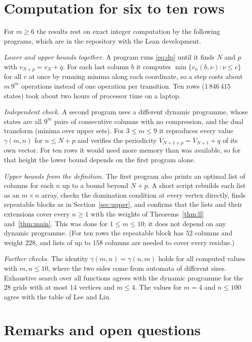 \documentclass[12pt]{article}
\theoremstyle{plain}
\theoremstyle{remark}
\begin{document}
\section{Computation for six to ten rows}\label{sec:comp}

For $m\ge6$ the results rest on exact integer computation by the following programs, which are
in the repository with the Lean development.

\emph{Lower and upper bounds together.} A program runs \eqref{eq:dp} until it finds $N$ and $p$
with $v_{N+p}=v_N+q$. For each last column $b$ it computes
$\min\{v_n(b,\nu):\nu\le c\}$ for all $c$ at once by running minima along each coordinate, so a
step costs about $m\,9^m$ operations instead of one operation per transition. Ten rows
($1\,846\,415$ states) took about two hours of processor time on a laptop.

\emph{Independent check.} A second program uses a different dynamic programme, whose states are
all $9^m$ pairs of consecutive columns with no compression, and the dual transform (minima over
upper sets). For $3\le m\le9$ it reproduces every value $\gamma(m,n)$ for $n\le N+p$ and
verifies the periodicity $V_{N+1+p}=V_{N+1}+q$ of its own vector. For ten rows it would need
more memory than was available, so for that height the lower bound depends on the first program
alone.

\emph{Upper bounds from the definition.} The first program also prints an optimal list of
columns for each $n$ up to a bound beyond $N+p$. A short script rebuilds each list as an
$m\times n$ array, checks the domination condition at every vertex directly, finds repeatable
blocks as in Section~\ref{sec:upper}, and confirms that the lists and their extensions cover
every $n\ge1$ with the weights of Theorems~\ref{thm:ll} and~\ref{thm:main}. This was done for
$1\le m\le 10$; it does not depend on any dynamic programme. (For ten rows the repeatable
block has $52$ columns and weight $228$, and lists of up to $158$ columns are needed to cover
every residue.)

\emph{Further checks.} The identity $\gamma(m,n)=\gamma(n,m)$ holds for all computed values
with $m,n\le10$, where the two sides come from automata of different sizes. Exhaustive search
over all functions agrees with the dynamic programme for the $28$ grids with at most $14$
vertices and $m\le4$. The values for $m=4$ and $n\le100$ agree with the table of Lee and Liu.

\section{Remarks and open questions}\label{sec:open}
\end{document}
